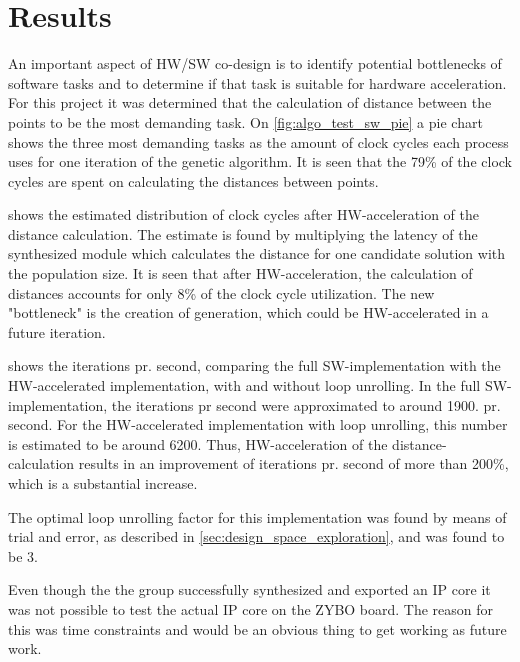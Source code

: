 
\chapter{Results}
An important aspect of HW/SW co-design is to identify potential bottlenecks of software tasks and to determine if that task is suitable for hardware acceleration. For this project it was determined that the calculation of distance between the points to be the most demanding task. On \cref{fig:algo_test_sw_pie} a pie chart shows the three most demanding tasks as the amount of clock cycles each process uses for one iteration of the genetic algorithm. It is seen that the 79\% of the clock cycles are spent on calculating the distances between points.

 shows the estimated distribution of clock cycles after HW-acceleration of the distance calculation. The estimate is found by multiplying the latency of the synthesized module which calculates the distance for one candidate solution with the population size. It is seen that after HW-acceleration, the calculation of distances accounts for only 8\% of the clock cycle utilization. The new "bottleneck" is the creation of generation, which could be HW-accelerated in a future iteration.

 shows the iterations pr. second, comparing the full SW-implementation with the HW-accelerated implementation, with and without loop unrolling. In the full SW-implementation, the iterations pr second were approximated to around 1900. pr. second. For the HW-accelerated implementation with loop unrolling, this number is estimated to be around 6200. Thus, HW-acceleration of the distance-calculation results in an improvement of iterations pr. second of more than 200\%, which is a substantial increase.

The optimal loop unrolling factor for this implementation was found by means of trial and error, as described in \cref{sec:design_space_exploration}, and was found to be 3.

Even though the the group successfully synthesized and exported an IP core it was not possible to test the actual IP core on the ZYBO board. The reason for this was time constraints and would be an obvious thing to get working as future work.


